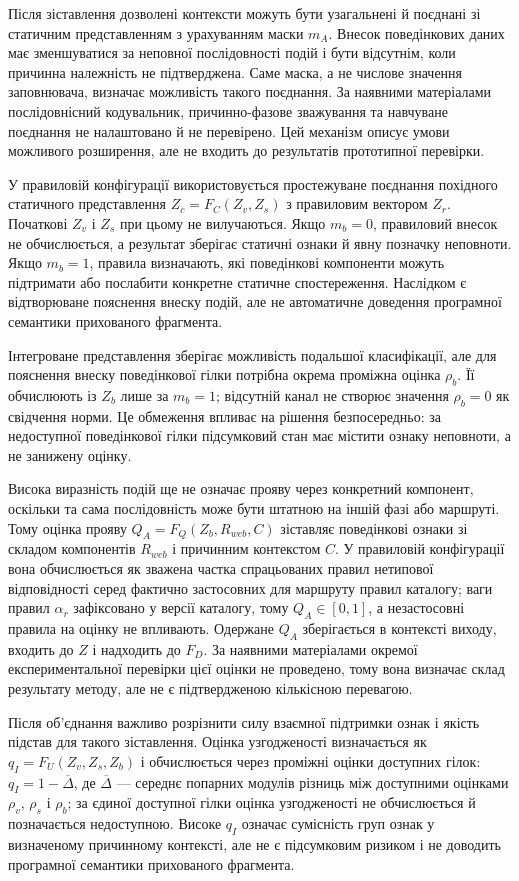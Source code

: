 Після зіставлення дозволені контексти можуть бути узагальнені й поєднані зі статичним представленням з урахуванням маски $m_A$. Внесок поведінкових даних має зменшуватися за неповної послідовності подій і бути відсутнім, коли причинна належність не підтверджена. Саме маска, а не числове значення заповнювача, визначає можливість такого поєднання. За наявними матеріалами послідовнісний кодувальник, причинно-фазове зважування та навчуване поєднання не налаштовано й не перевірено. Цей механізм описує умови можливого розширення, але не входить до результатів прототипної перевірки.

У правиловій конфігурації використовується простежуване поєднання похідного статичного представлення $Z_c=F_C(Z_v,Z_s)$ з правиловим вектором $Z_r$. Початкові $Z_v$ і $Z_s$ при цьому не вилучаються. Якщо $m_b=0$, правиловий внесок не обчислюється, а результат зберігає статичні ознаки й явну позначку неповноти. Якщо $m_b=1$, правила визначають, які поведінкові компоненти можуть підтримати або послабити конкретне статичне спостереження. Наслідком є відтворюване пояснення внеску подій, але не автоматичне доведення програмної семантики прихованого фрагмента.

Інтегроване представлення зберігає можливість подальшої класифікації, але для пояснення внеску поведінкової гілки потрібна окрема проміжна оцінка $\rho_b$. Її обчислюють із $Z_b$ лише за $m_b=1$; відсутній канал не створює значення $\rho_b=0$ як свідчення норми. Це обмеження впливає на рішення безпосередньо: за недоступної поведінкової гілки підсумковий стан має містити ознаку неповноти, а не занижену оцінку.

Висока виразність подій ще не означає прояву через конкретний компонент, оскільки та сама послідовність може бути штатною на іншій фазі або маршруті. Тому оцінка прояву $Q_A=F_Q(Z_b,R_{web},C)$ зіставляє поведінкові ознаки зі складом компонентів $R_{web}$ і причинним контекстом $C$. У правиловій конфігурації вона обчислюється як зважена частка спрацьованих правил нетипової відповідності серед фактично застосовних для маршруту правил каталогу; ваги правил $\alpha_r$ зафіксовано у версії каталогу, тому $Q_A\in[0,1]$, а незастосовні правила на оцінку не впливають. Одержане $Q_A$ зберігається в контексті виходу, входить до $Z$ і надходить до $F_D$. За наявними матеріалами окремої експериментальної перевірки цієї оцінки не проведено, тому вона визначає склад результату методу, але не є підтвердженою кількісною перевагою.

Після об’єднання важливо розрізнити силу взаємної підтримки ознак і якість підстав для такого зіставлення. Оцінка узгодженості визначається як $q_I=F_U(Z_v,Z_s,Z_b)$ і обчислюється через проміжні оцінки доступних гілок: $q_I=1-\overline{\Delta}$, де $\overline{\Delta}$ --- середнє попарних модулів різниць між доступними оцінками $\rho_v$, $\rho_s$ і $\rho_b$; за єдиної доступної гілки оцінка узгодженості не обчислюється й позначається недоступною. Високе $q_I$ означає сумісність груп ознак у визначеному причинному контексті, але не є підсумковим ризиком і не доводить програмної семантики прихованого фрагмента.

